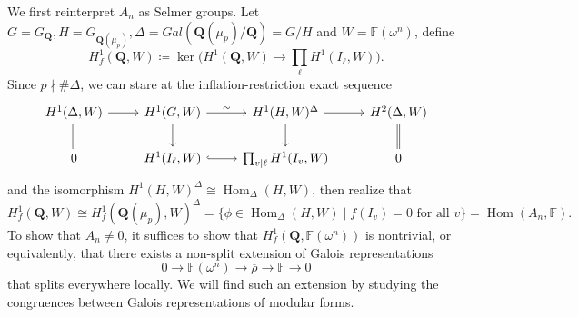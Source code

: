 \documentclass[11pt]{amsart}
\newcommand{\Q}{\mathbf{Q}}  %
\newcommand{\Hom}{\operatorname{Hom}}
\theoremstyle{definition}
\theoremstyle{definition}
\theoremstyle{definition}
\theoremstyle{definition}
\theoremstyle{definition}
\theoremstyle{definition}
\begin{document}
We first reinterpret $A_n$ as Selmer groups.
Let $G=G_\Q, H=G_{\Q(\mu_p)}, \Delta=Gal(\Q(\mu_p)/\Q)=G/H$ and $W=\mathbb{F}(\omega^n)$,
define
\begin{equation*}
    H^1_f(\Q,W)\coloneqq
    \ker\bigg(
    H^1(\Q,W)\to\prod_{\ell}
    H^1(I_\ell,W)
    \bigg).
\end{equation*}
Since $p\nmid \#\Delta$, we can stare at the inflation-restriction exact sequence
\begin{equation*}
    \begin{tikzcd}
        H^1(\Delta,W) \arrow[r]\arrow[d,equal]&
        H^1(G,W) \arrow[r,"\sim"]\arrow[d]&
        H^1(H,W)^{\Delta} \arrow[r]\arrow[d]&
        H^2(\Delta,W)\arrow[d,equal]\\
        0&H^1(I_\ell,W) \arrow[r,hookrightarrow]
        &\prod_{v\mid \ell}H^1(I_v,W)& 0
    \end{tikzcd}
\end{equation*}
and the isomorphism $H^1(H,W)^{\Delta}\cong \Hom_{\Delta}(H, W)$,
then realize that
\begin{equation*}
    H^1_f(\Q,W)\cong H^1_f(\Q(\mu_p),W)^\Delta
    =\{ \phi\in \Hom_\Delta(H, W)\mid
    f(I_v)=0 \text{ for all } v\}= \Hom(A_n,\mathbb{F}).
\end{equation*}
To show that $A_n\neq 0$, it suffices to show that 
$H^1_f(\Q,\mathbb{F}(\omega^n))$
is nontrivial, or equivalently, that there exists a non-split extension
of Galois representations
\begin{equation*}
    0 \to \mathbb{F}(\omega^n)\to \overline{\rho} \to \mathbb{F}\to 0
\end{equation*}
that splits everywhere locally. We will find such an extension by studying the congruences between Galois representations of modular forms. 
\end{document}
